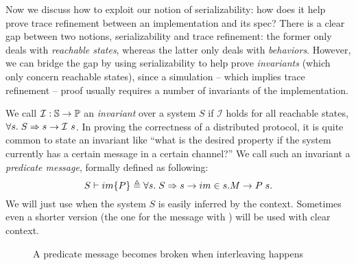\documentclass[sigplan,10pt,review,anonymous,screen]{acmart}\settopmatter{printfolios=true,printccs=false,printacmref=false}
\begin{document}
Now we discuss how to exploit our notion of serializability: how does it help prove trace refinement between an implementation and its spec?
There is a clear gap between two notions, serializability and trace refinement: the former only deals with \emph{reachable states}, whereas the latter only deals with \emph{behaviors}.
However, we can bridge the gap by using serializability to help prove \emph{invariants} (which only concern reachable states), since a simulation -- which implies trace refinement -- proof usually requires a number of invariants of the implementation.

We call $\mathcal{I}: \mathbb{S}{} \to \mathbb{P}{}$ an \emph{invariant} over a system $S$ if $\mathcal{I}$ holds for all reachable states, \ie{} $\forall s.\; S \Rightarrow s \to \mathcal{I}\ s$.
In proving the correctness of a distributed protocol, it is quite common to state an invariant like ``what is the desired property if the system currently has a certain message in a certain channel?''
We call such an invariant a \emph{predicate message}, formally defined as following:
\begin{displaymath}
  S \vdash im\{P\} \triangleq \forall s.\; S \Rightarrow s \to im \in s.M \to P\; s.
\end{displaymath}
We will just use  when the system $S$ is easily inferred by the context.
Sometimes even a shorter version  (the one for the message with \msgid{}) will be used with clear context.

\begin{figure}[h]
  \centering
  \caption{A predicate message becomes broken when interleaving happens}
  \vspace{-5pt}
  \label{fig-ex-pred-msg-fail}
\end{figure}
\end{document}
